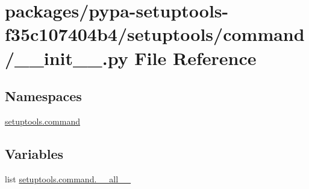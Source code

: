 \hypertarget{packages_2pypa-setuptools-f35c107404b4_2setuptools_2command_2____init_____8py}{}\section{packages/pypa-\/setuptools-\/f35c107404b4/setuptools/command/\+\_\+\+\_\+init\+\_\+\+\_\+.py File Reference}
\label{packages_2pypa-setuptools-f35c107404b4_2setuptools_2command_2____init_____8py}
\subsection*{Namespaces}
\begin{DoxyCompactItemize}
\item 
 \hyperlink{namespacesetuptools_1_1command}{setuptools.\+command}
\end{DoxyCompactItemize}
\subsection*{Variables}
\begin{DoxyCompactItemize}
\item 
list \hyperlink{namespacesetuptools_1_1command_a9849f1fc79c2a58181a879d859f1a1d3}{setuptools.\+command.\+\_\+\+\_\+all\+\_\+\+\_\+}
\end{DoxyCompactItemize}
